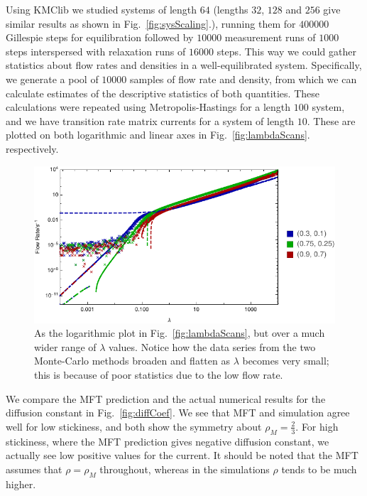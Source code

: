 \documentclass[
reprint, amsmath,amssymb,
]{revtex4-1}
\begin{document}
Using KMClib we studied systems of length $64$ (lengths $32$, $128$ and $256$ give similar
results as shown in Fig.~\ref{fig:sysScaling}.), running them for $400000$ Gillespie steps for equilibration
followed by $10000$ measurement runs of $1000$ steps interspersed with
relaxation runs of $16000$ steps. This way we could gather statistics
about flow rates and densities in a well-equilibrated
system. Specifically, we generate a pool of $10000$ samples of flow
rate and density, from which we can calculate estimates of the
descriptive statistics of both quantities.
These calculations were repeated using Metropolis-Hastings for a length $100$ system, and we have transition rate matrix currents
for a system of length $10$. These are plotted on both logarithmic and linear axes in Fig.~\ref{fig:lambdaScans}.
respectively.

\begin{figure}[h!]
\vspace{0em}
\begin{center}
    \includegraphics[width=1\linewidth]{allDataWide}
\end{center}
\caption{\label{fig:wideScans} As the logarithmic plot in Fig.~\ref{fig:lambdaScans}, but over a much wider range of $\lambda$ values. Notice how the data series from the two Monte-Carlo
methods broaden and flatten as $\lambda$ becomes very small; this is because of poor statistics due to the low flow rate.
}
    \vspace{0em}
\end{figure}

We compare the MFT prediction and the actual numerical results for the
diffusion constant in Fig.~\ref{fig:diffCoef}. We see that MFT and
simulation agree well for low stickiness, and both show the symmetry
about $\rho_M = \frac{2}{3}$. For high stickiness, where the MFT
prediction gives negative diffusion constant, we actually see low
positive values for the current.  It should be noted that the MFT
assumes that $\rho = \rho_M$ throughout, whereas in the simulations $\rho$ tends to be much higher.
\end{document}
